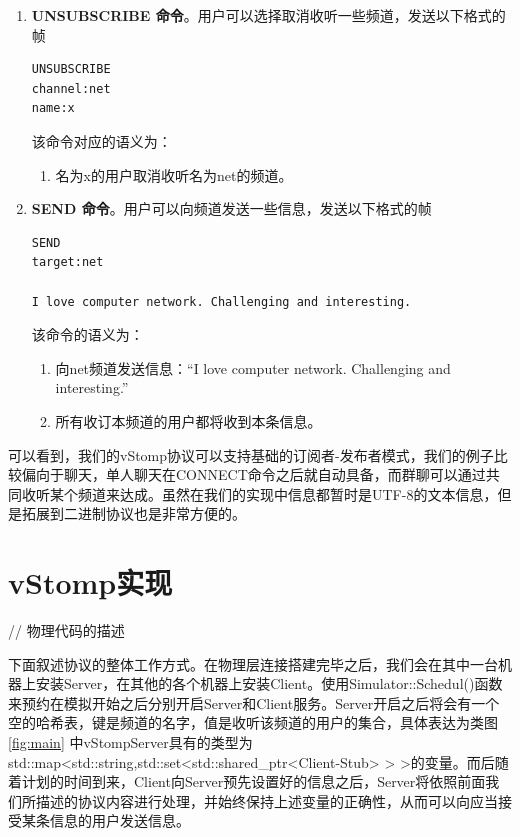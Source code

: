 \documentclass{ctexrep}
\begin{document}
\begin{enumerate}
\begin{enumerate}
		\end{enumerate}
		\item \textbf{UNSUBSCRIBE 命令}。用户可以选择取消收听一些频道，发送以下格式的帧\begin{lstlisting}
UNSUBSCRIBE
channel:net
name:x
		\end{lstlisting}该命令对应的语义为：\begin{enumerate}
			\item 名为x的用户取消收听名为net的频道。
		\end{enumerate}
		\item \textbf{SEND 命令}。用户可以向频道发送一些信息，发送以下格式的帧\begin{lstlisting}
SEND
target:net

I love computer network. Challenging and interesting.
		\end{lstlisting}该命令的语义为：\begin{enumerate}
			\item 向net频道发送信息：“I love computer network. Challenging and interesting.”
			\item 所有收订本频道的用户都将收到本条信息。
		\end{enumerate}
	\end{enumerate}

可以看到，我们的vStomp协议可以支持基础的订阅者-发布者模式，我们的例子比较偏向于聊天，单人聊天在CONNECT命令之后就自动具备，而群聊可以通过共同收听某个频道来达成。虽然在我们的实现中信息都暂时是UTF-8的文本信息，但是拓展到二进制协议也是非常方便的。
	\chapter{vStomp实现}
	// 物理代码的描述
	
	下面叙述协议的整体工作方式。在物理层连接搭建完毕之后，我们会在其中一台机器上安装Server，在其他的各个机器上安装Client。使用Simulator::Schedul()函数来预约在模拟开始之后分别开启Server和Client服务。Server开启之后将会有一个空的哈希表，键是频道的名字，值是收听该频道的用户的集合，具体表达为类图 \ref{fig:main} 中vStompServer具有的类型为std::map<std::string,std::set<std::shared\_ptr<Client-Stub> > >的变量。而后随着计划的时间到来，Client向Server预先设置好的信息之后，Server将依照前面我们所描述的协议内容进行处理，并始终保持上述变量的正确性，从而可以向应当接受某条信息的用户发送信息。 
	
\end{document}
